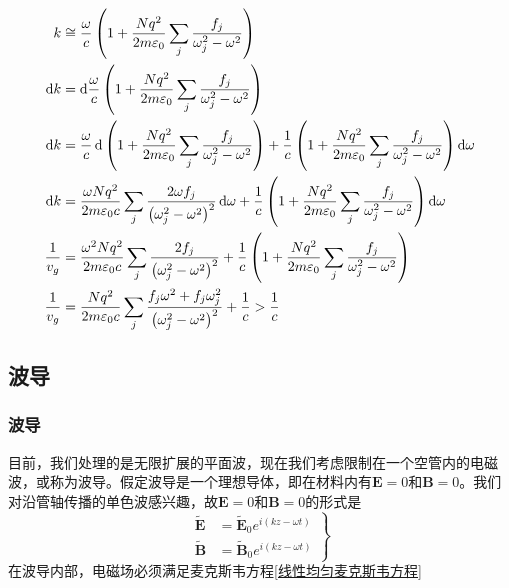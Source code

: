 \begin{align*}
    k&\cong \frac{\omega}{c}\left(1+\frac{Nq^2}{2m\varepsilon_0}\sum_j\frac{f_j}{\omega_j^2-\omega^2}\right)\\
    \dif k&=\dif \frac{\omega}{c}\left(1+\frac{Nq^2}{2m\varepsilon_0}\sum_j\frac{f_j}{\omega_j^2-\omega^2}\right)\\
    \dif k&=\frac{\omega}{c}\dif \left(1+\frac{Nq^2}{2m\varepsilon_0}\sum_j\frac{f_j}{\omega_j^2-\omega^2}\right)
    +\frac{1}{c}\left(1+\frac{Nq^2}{2m\varepsilon_0}\sum_j\frac{f_j}{\omega_j^2-\omega^2}\right)\dif\omega \\
    \dif k&=\frac{\omega Nq^2}{2m\varepsilon_0c}\sum_j \frac{2\omega f_j}{\left(\omega_j^2-\omega^2\right)^2}\dif\omega
    +\frac{1}{c}\left(1+\frac{Nq^2}{2m\varepsilon_0}\sum_j\frac{f_j}{\omega_j^2-\omega^2}\right)\dif\omega \\
    \frac{1}{v_g}&=\frac{\omega^2 Nq^2}{2m\varepsilon_0c}\sum_j \frac{2f_j}{\left(\omega_j^2-\omega^2\right)^2}
    +\frac{1}{c}\left(1+\frac{Nq^2}{2m\varepsilon_0}\sum_j\frac{f_j}{\omega_j^2-\omega^2}\right)\\
    \frac{1}{v_g}&=\frac{ Nq^2}{2m\varepsilon_0c}\sum_j \frac{f_j\omega^2+f_j\omega_j^2}{\left(\omega_j^2-\omega^2\right)^2}
    +\frac{1}{c}>\frac{1}{c}
\end{align*}

\subsection{波导}
\subsubsection{波导}
目前，我们处理的是无限扩展的平面波，现在我们考虑限制在一个空管内的电磁波，或称为波导。假定波导是一个理想导体，即在材料内有$\boldsymbol E=0$和$\boldsymbol B=0$。我们对沿管轴传播的单色波感兴趣，故$\boldsymbol E=0$和$\boldsymbol B=0$的形式是
\begin{equation}
\left.\begin{aligned}
\widetilde{\boldsymbol{E}} &= \widetilde{\boldsymbol{E}}_{0}e^{i(kz-\omega t)}\\
\widetilde{\boldsymbol{B}} &= \widetilde{\boldsymbol{B}}_{0}e^{i(kz-\omega t)}
\end{aligned}\right\}
\end{equation}
在波导内部，电磁场必须满足麦克斯韦方程\ref{线性均匀麦克斯韦方程}

